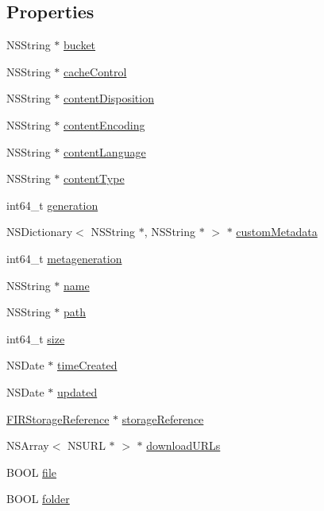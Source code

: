 \subsection*{Properties}
\begin{DoxyCompactItemize}
\item 
N\+S\+String $\ast$ \hyperlink{interface_f_i_r_storage_metadata_a6ec4ccad9a1d014f4b3d2886c7087670}{bucket}
\item 
N\+S\+String $\ast$ \hyperlink{interface_f_i_r_storage_metadata_a9295ac69ec90b478fbb46d333cc7f6d7}{cache\+Control}
\item 
N\+S\+String $\ast$ \hyperlink{interface_f_i_r_storage_metadata_a95ddd8f9198315b23c4501f057c0493f}{content\+Disposition}
\item 
N\+S\+String $\ast$ \hyperlink{interface_f_i_r_storage_metadata_a76ab3cc6c1281e52ca634a8e3988971d}{content\+Encoding}
\item 
N\+S\+String $\ast$ \hyperlink{interface_f_i_r_storage_metadata_a42c55f8c2b8a161440a0e1b11eedcb1c}{content\+Language}
\item 
N\+S\+String $\ast$ \hyperlink{interface_f_i_r_storage_metadata_aa25b5eeafc607411a4c40071e29b626e}{content\+Type}
\item 
int64\+\_\+t \hyperlink{interface_f_i_r_storage_metadata_acd11f19a7fcbb1f2659f726a64a6f98a}{generation}
\item 
N\+S\+Dictionary$<$ N\+S\+String $\ast$, N\+S\+String $\ast$ $>$ $\ast$ \hyperlink{interface_f_i_r_storage_metadata_a4c8c37ff4ab534e9ae422111b18b38c6}{custom\+Metadata}
\item 
int64\+\_\+t \hyperlink{interface_f_i_r_storage_metadata_a180ce1f0978ba7c89b6381bd123af20c}{metageneration}
\item 
N\+S\+String $\ast$ \hyperlink{interface_f_i_r_storage_metadata_a9c68a1e47f6d3dc053e2c291bdf91e6b}{name}
\item 
N\+S\+String $\ast$ \hyperlink{interface_f_i_r_storage_metadata_a27e524765d46c62512a894ff7e361619}{path}
\item 
int64\+\_\+t \hyperlink{interface_f_i_r_storage_metadata_a20b034c311ea8d5d712bb1068feaa3e0}{size}
\item 
N\+S\+Date $\ast$ \hyperlink{interface_f_i_r_storage_metadata_a70044f390f5ff5ef27179498a97e4454}{time\+Created}
\item 
N\+S\+Date $\ast$ \hyperlink{interface_f_i_r_storage_metadata_aae35491c0e2247378e80a4347cfe9d5c}{updated}
\item 
\hyperlink{interface_f_i_r_storage_reference}{F\+I\+R\+Storage\+Reference} $\ast$ \hyperlink{interface_f_i_r_storage_metadata_af2ad54d3a7335a0a7979462179e111b5}{storage\+Reference}
\item 
N\+S\+Array$<$ N\+S\+U\+R\+L $\ast$ $>$ $\ast$ \hyperlink{interface_f_i_r_storage_metadata_ad9f8ea32b8ad163cd6fdb940fbd7a71c}{download\+U\+R\+Ls}
\item 
B\+O\+O\+L \hyperlink{interface_f_i_r_storage_metadata_a322014be3799e4bedf649487503fee4a}{file}
\item 
B\+O\+O\+L \hyperlink{interface_f_i_r_storage_metadata_a99ce3b3110b480cc90a8120a70dec971}{folder}
\end{DoxyCompactItemize}


